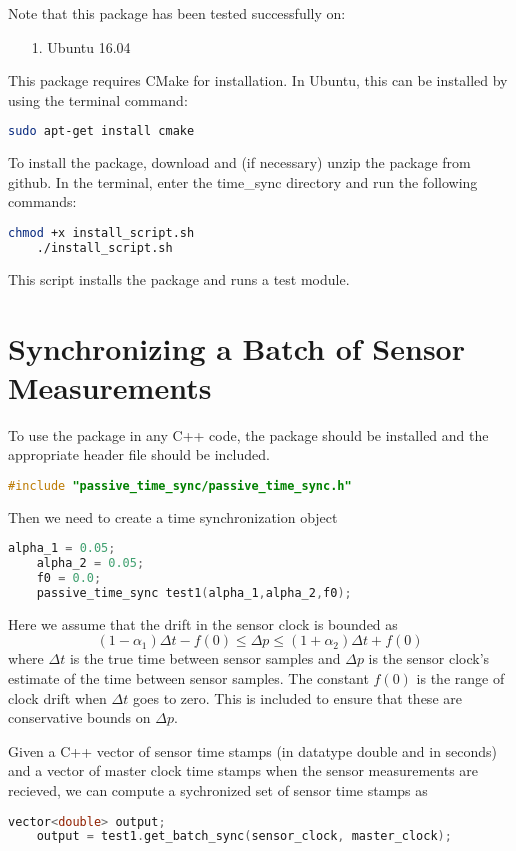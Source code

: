 \documentclass[11pt,a4paper]{article}
\begin{document}
Note that this package has been tested successfully on:
	\begin{itemize}
		\item[1.] Ubuntu 16.04
	\end{itemize}

This package requires CMake for installation. In Ubuntu, this can be installed by using the terminal command:
\begin{lstlisting}[language=bash]
	sudo apt-get install cmake
\end{lstlisting}

To install the package, download and (if necessary) unzip the package from github. In the terminal, enter the time\_sync directory and run the following commands:
\begin{lstlisting}[language=bash]
	chmod +x install_script.sh
	./install_script.sh
\end{lstlisting}

This script installs the package and runs a test module.

\section{Synchronizing a Batch of Sensor Measurements} 

To use the package in any C++ code, the package should be installed and the appropriate header file should be included.
\begin{lstlisting}[language=C++]
	#include "passive_time_sync/passive_time_sync.h"
\end{lstlisting}

Then we need to create a time synchronization object
\begin{lstlisting}[language=C++]
	alpha_1 = 0.05;
	alpha_2 = 0.05;
	f0 = 0.0;
	passive_time_sync test1(alpha_1,alpha_2,f0);
\end{lstlisting}
Here we assume that the drift in the sensor clock is bounded as
\begin{equation}
	(1-\alpha_1)\Delta t - f(0) \leq \Delta p \leq (1+\alpha_2)\Delta t + f(0)
\end{equation}
where $\Delta t$ is the true time between sensor samples and $\Delta p$ is the sensor clock's estimate of the time between sensor samples. The constant $f(0)$ is the range of clock drift when $\Delta t$ goes to zero. This is included to ensure that these are conservative bounds on $\Delta p$.

Given a C++ vector of sensor time stamps (in datatype double and in seconds) and a vector of master clock time stamps when the sensor measurements are recieved, we can compute a sychronized set of sensor time stamps as
\begin{lstlisting}[language=C++]
	vector<double> output;
	output = test1.get_batch_sync(sensor_clock, master_clock);
\end{lstlisting}
\end{document}

